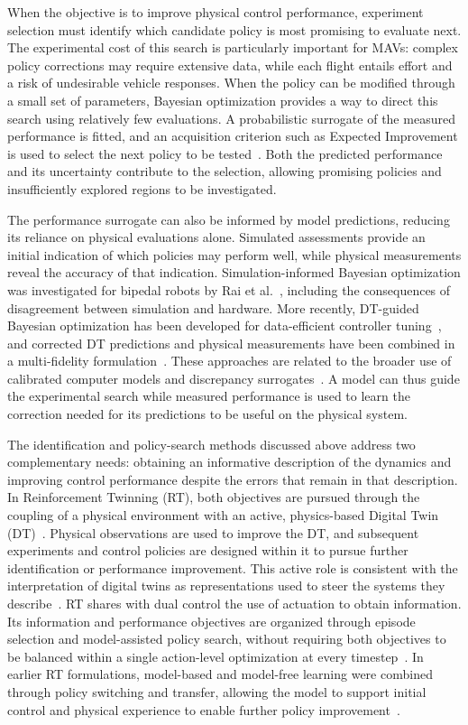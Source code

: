 \documentclass[journal]{IEEEtran}
\begin{document}
When the objective is to improve physical control performance, experiment selection must identify which candidate policy is most promising to evaluate next. The experimental cost of this search is particularly important for MAVs: complex policy corrections may require extensive data, while each flight entails effort and a risk of undesirable vehicle responses. When the policy can be modified through a small set of parameters, Bayesian optimization provides a way to direct this search using relatively few evaluations. A probabilistic surrogate of the measured performance is fitted, and an acquisition criterion such as Expected Improvement is used to select the next policy to be tested~\cite{Mockus1975,Jones1998}. Both the predicted performance and its uncertainty contribute to the selection, allowing promising policies and insufficiently explored regions to be investigated.

The performance surrogate can also be informed by model predictions, reducing its reliance on physical evaluations alone. Simulated assessments provide an initial indication of which policies may perform well, while physical measurements reveal the accuracy of that indication. Simulation-informed Bayesian optimization was investigated for bipedal robots by Rai et al.~\cite{Rai2019}, including the consequences of disagreement between simulation and hardware. More recently, DT-guided Bayesian optimization has been developed for data-efficient controller tuning~\cite{Nobar2025}, and corrected DT predictions and physical measurements have been combined in a multi-fidelity formulation~\cite{Nobar2026}. These approaches are related to the broader use of calibrated computer models and discrepancy surrogates~\cite{Kennedy2001,Forrester2007}. A model can thus guide the experimental search while measured performance is used to learn the correction needed for its predictions to be useful on the physical system.

The identification and policy-search methods discussed above address two complementary needs: obtaining an informative description of the dynamics and improving control performance despite the errors that remain in that description. In Reinforcement Twinning (RT), both objectives are pursued through the coupling of a physical environment with an active, physics-based Digital Twin (DT)~\cite{SchenaRT2023,Mendez2026}. Physical observations are used to improve the DT, and subsequent experiments and control policies are designed within it to pursue further identification or performance improvement. This active role is consistent with the interpretation of digital twins as representations used to steer the systems they describe~\cite{Korenhof2021,Wagg2025}. RT shares with dual control the use of actuation to obtain information. Its information and performance objectives are organized through episode selection and model-assisted policy search, without requiring both objectives to be balanced within a single action-level optimization at every timestep~\cite{Mendez2026}. In earlier RT formulations, model-based and model-free learning were combined through policy switching and transfer, allowing the model to support initial control and physical experience to enable further policy improvement~\cite{SchenaRT2023,PolettiRT2025}.
\end{document}
